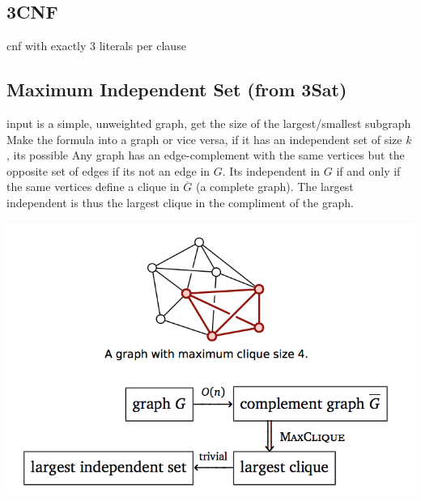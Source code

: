 \subsection{3CNF}
cnf with exactly 3 literals per clause

\subsection{Maximum Independent Set (from 3Sat)}
input is a simple, unweighted graph, get the size of the largest/smallest subgraph
Make the formula into a graph or vice versa, if it has an independent set of size $k$, its possible
Any graph has an edge-complement with the same vertices but the opposite set of edges if its not an edge in $G$. Its independent in $G$ if and only if the same vertices define a clique in $\overbar{G}$ (a complete graph). The largest independent is thus the largest clique in the compliment of the graph.

\includegraphics[width=\linewidth]{images/maxclique.png}

